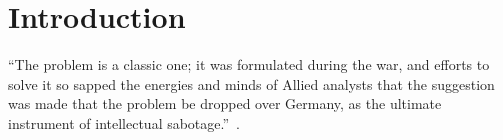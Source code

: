 \chapter{Introduction}
\enquote{The problem is a  classic one; it was formulated during the war, and efforts to solve it so sapped the energies and minds of Allied analysts that the suggestion was made that the problem be dropped over Germany, as the ultimate instrument of intellectual sabotage.}~\autocite{whittle1979}.